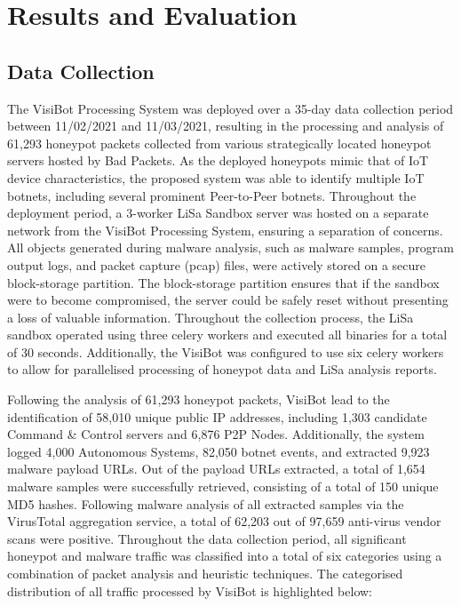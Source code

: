 
\chapter{Results and Evaluation}

\section{Data Collection}

The VisiBot Processing System was deployed over a 35-day data collection period between 11/02/2021 and 11/03/2021, resulting in the processing and analysis of 61,293 honeypot packets collected from various strategically located honeypot servers hosted by Bad Packets. As the deployed honeypots mimic that of IoT device characteristics, the proposed system was able to identify multiple IoT botnets, including several prominent Peer-to-Peer botnets. Throughout the deployment period, a 3-worker LiSa Sandbox server was hosted on a separate network from the VisiBot Processing System, ensuring a separation of concerns. All objects generated during malware analysis, such as malware samples, program output logs, and packet capture (pcap) files, were actively stored on a secure block-storage partition. The block-storage partition ensures that if the sandbox were to become compromised, the server could be safely reset without presenting a loss of valuable information. Throughout the collection process, the LiSa sandbox operated using three celery workers and executed all binaries for a total of 30 seconds. Additionally, the VisiBot was configured to use six celery workers to allow for parallelised processing of honeypot data and LiSa analysis reports.

Following the analysis of 61,293 honeypot packets, VisiBot lead to the identification of 58,010 unique public IP addresses, including 1,303 candidate Command \& Control servers and 6,876 P2P Nodes. Additionally, the system logged 4,000 Autonomous Systems, 82,050 botnet events, and extracted 9,923 malware payload URLs. Out of the payload URLs extracted, a total of 1,654 malware samples were successfully retrieved, consisting of a total of 150 unique MD5 hashes. Following malware analysis of all extracted samples via the VirusTotal aggregation service, a total of 62,203 out of 97,659 anti-virus vendor scans were positive. Throughout the data collection period, all significant honeypot and malware traffic was classified into a total of six categories using a combination of packet analysis and heuristic techniques. The categorised distribution of all traffic processed by VisiBot is highlighted below: 

